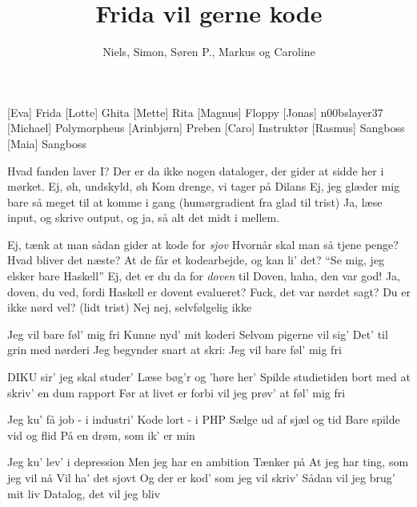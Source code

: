 \documentclass[a4paper,11pt]{article}
\title{Frida vil gerne kode}
\author{Niels, Simon, Søren P., Markus og Caroline}
\begin{document}
\maketitle

\begin{roles}
  [Eva] Frida
  [Lotte] Ghita
  [Mette] Rita
  [Magnus] Floppy
  [Jonas] n00bslayer37
  [Michael] Polymorpheus
  [Arinbjørn] Preben
  [Caro] Instruktør
  [Rasmus] Sangboss
  [Maia] Sangboss
\end{roles}

\begin{sketch}
   Hvad fanden laver I? Der er da ikke nogen dataloger, der gider at sidde her i mørket.
   Ej, øh, undskyld, øh
   Kom drenge, vi tager på Dilans
   Ej, jeg glæder mig bare så meget til at komme i gang
   (humørgradient fra glad til trist) Ja, læse input, og skrive output, og ja, så alt det midt i mellem.

   Ej, tænk at man sådan gider at kode for \emph{sjov}
   Hvornår skal man så tjene penge?
   Hvad bliver det næste? At de får et kodearbejde, og kan li' det?
   ``Se mig, jeg elsker bare Haskell''
   Ej, det er du da for \emph{doven} til
   Doven, haha, den var god!
   Ja, doven, du ved, fordi Haskell er dovent evalueret?
   Fuck, det var nørdet sagt?
   Du er ikke nørd vel?
   (lidt trist) Nej nej, selvfølgelig ikke
\end{sketch}

\begin{song}
  Jeg vil bare føl' mig fri
  Kunne nyd' mit koderi
  Selvom pigerne vil sig'
  Det' til grin med nørderi
  Jeg begynder snart at skri:
  Jeg vil bare føl' mig fri

  DIKU sir' jeg skal studer'
  Læse bøg'r og 'høre her'
  Spilde studietiden bort
  med at skriv' en dum rapport
  Før at livet er forbi
  vil jeg prøv' at føl' mig fri

  Jeg ku' få job - i industri'
  Kode lort - i PHP
  Sælge ud af sjæl og tid
  Bare spilde vid og flid
  På en drøm, som ik' er min

  Jeg ku' lev' i depression
  Men jeg har en ambition
  Tænker på
  At jeg har ting, som jeg vil nå
  Vil ha' det sjovt
  Og der er kod' som jeg vil skriv'
  Sådan vil jeg brug' mit liv
  Datalog, det vil jeg bliv


\end{song}
\end{document}
